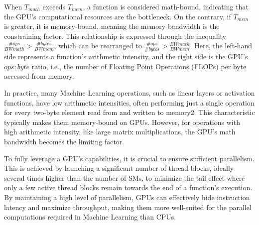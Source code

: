 When $ T_{math} $ exceeds $ T_{mem} $, a function is considered math-bound, indicating that the GPU's computational resources are the bottleneck. On the contrary, if $ T_{mem} $ is greater, it is memory-bound, meaning the memory bandwidth is the constraining factor. This relationship is expressed through the inequality $ \frac{\# ops}{BW{math}} > \frac{\# bytes}{BW{mem}} $, which can be rearranged to $ \frac{\# ops}{\# bytes} > \frac{BW{math}}{BW{mem}} $. Here, the left-hand side represents a function's arithmetic intensity, and the right side is the GPU's $ops:byte$ ratio, i.e., the number of Floating Point Operations (FLOPs) per byte accessed from memory.

In practice, many Machine Learning operations, such as linear layers or activation functions, have low arithmetic intensities, often performing just a single operation for every two-byte element read from and written to memory2. This characteristic typically makes them memory-bound on GPUs. However, for operations with high arithmetic intensity, like large matrix multiplications, the GPU's math bandwidth becomes the limiting factor.

To fully leverage a GPU's capabilities, it is crucial to ensure sufficient parallelism. This is achieved by launching a significant number of thread blocks, ideally several times higher than the number of SMs, to minimize the tail effect where only a few active thread blocks remain towards the end of a function's execution. By maintaining a high level of parallelism, GPUs can effectively hide instruction latency and maximize throughput, making them more well-suited for the parallel computations required in Machine Learning than CPUs.
